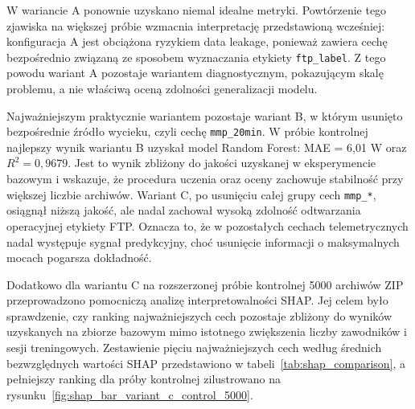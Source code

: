\FloatBarrier

W wariancie A ponownie uzyskano niemal idealne metryki. Powtórzenie tego zjawiska na większej próbie wzmacnia interpretację przedstawioną wcześniej: konfiguracja A jest obciążona ryzykiem data leakage, ponieważ zawiera cechę bezpośrednio związaną ze sposobem wyznaczania etykiety \texttt{ftp\_label}. Z tego powodu wariant A pozostaje wariantem diagnostycznym, pokazującym skalę problemu, a nie właściwą oceną zdolności generalizacji modelu.

Najważniejszym praktycznie wariantem pozostaje wariant B, w którym usunięto bezpośrednie źródło wycieku, czyli cechę \texttt{mmp\_20min}. W próbie kontrolnej najlepszy wynik wariantu B uzyskał model Random Forest: MAE = 6{,}01 W oraz $R^2 = 0{,}9679$. Jest to wynik zbliżony do jakości uzyskanej w eksperymencie bazowym i wskazuje, że procedura uczenia oraz oceny zachowuje stabilność przy większej liczbie archiwów. Wariant C, po usunięciu całej grupy cech \texttt{mmp\_*}, osiągnął niższą jakość, ale nadal zachował wysoką zdolność odtwarzania operacyjnej etykiety FTP. Oznacza to, że w pozostałych cechach telemetrycznych nadal występuje sygnał predykcyjny, choć usunięcie informacji o maksymalnych mocach pogarsza dokładność.

Dodatkowo dla wariantu C na rozszerzonej próbie kontrolnej 5000 archiwów ZIP przeprowadzono pomocniczą analizę interpretowalności SHAP. Jej celem było sprawdzenie, czy ranking najważniejszych cech pozostaje zbliżony do wyników uzyskanych na zbiorze bazowym mimo istotnego zwiększenia liczby zawodników i sesji treningowych. Zestawienie pięciu najważniejszych cech według średnich bezwzględnych wartości SHAP przedstawiono w tabeli~\ref{tab:shap_comparison}, a pełniejszy ranking dla próby kontrolnej zilustrowano na rysunku~\ref{fig:shap_bar_variant_c_control_5000}.

